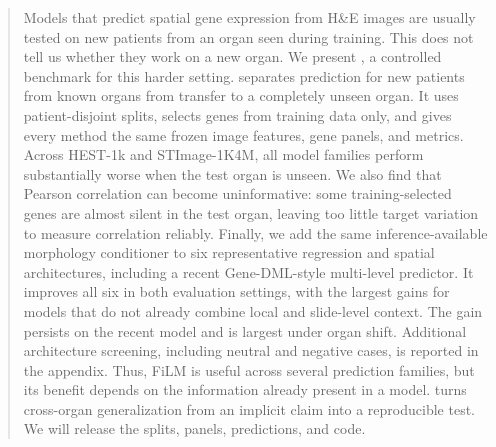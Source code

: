 \begin{abstract}
Models that predict spatial gene expression from H\&E images are usually tested on new patients from
an organ seen during training. This does not tell us whether they work on a new organ. We present
\coast{}, a controlled benchmark for this harder setting. \coast{} separates prediction for new
patients from known organs from transfer to a completely unseen organ. It uses patient-disjoint
splits, selects genes from training data only, and gives every method the same frozen image features,
gene panels, and metrics. Across HEST-1k and STImage-1K4M, all model families perform substantially
worse when the test organ is unseen. We also find that Pearson correlation can become uninformative:
some training-selected genes are almost silent in the test organ, leaving too little target variation
to measure correlation reliably. Finally, we add the same inference-available morphology conditioner
to six representative regression and spatial architectures, including a recent Gene-DML-style
multi-level predictor. It improves all six in both evaluation
settings, with the largest gains for models that do not already combine local and slide-level context.
The gain persists on the recent model and is largest under organ shift. Additional architecture
screening, including neutral and negative cases, is reported in the appendix.
Thus, FiLM is useful across several prediction families, but its benefit depends on the information
already present in a model. \coast{} turns cross-organ generalization from
an implicit claim into a reproducible test. We will release the splits, panels, predictions, and code.
\end{abstract}
